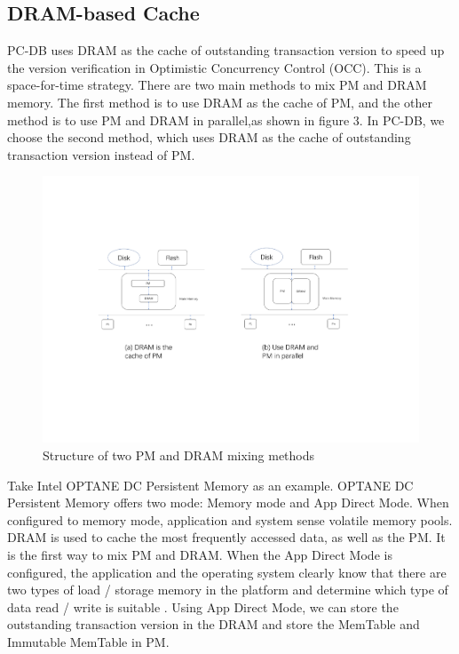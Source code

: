 \subsection{DRAM-based Cache}
PC-DB uses DRAM as the cache of outstanding transaction version to speed up the version verification in Optimistic Concurrency Control (OCC). 
This is a space-for-time strategy.
There are two main methods to mix PM and DRAM memory. The first method is to use DRAM as the cache of PM, and the other method is to use PM and DRAM in parallel,as shown in figure 3. In PC-DB, we choose the second method, which uses DRAM as the cache of outstanding transaction version instead of PM.
\begin{figure}
    \centering
    \includegraphics[width=0.36\paperwidth]{figure/PM_DRAM.pdf}
    \caption{Structure of two PM and DRAM mixing methods}
    \label{fig:throughput}
\end{figure}
Take Intel OPTANE DC Persistent Memory\cite{OPTANE} as an example. 
OPTANE DC Persistent Memory offers two mode: Memory mode and App Direct Mode. 
When configured to memory mode, application and system sense volatile memory pools. 
DRAM is used to cache the most frequently accessed data, as well as the PM. 
It is the first way to mix PM and DRAM. When the App Direct Mode is configured, 
the application and the operating system clearly know that 
there are two types of load / storage memory in the platform and determine which type of data read / write is suitable . 
Using App Direct Mode, we can store the outstanding transaction version in the DRAM and store the MemTable and Immutable MemTable in PM. 

